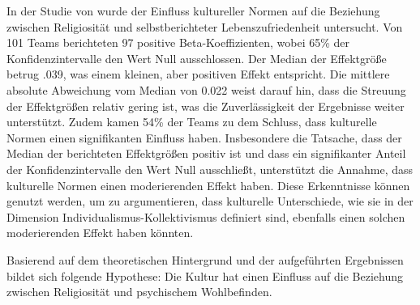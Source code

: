 In der Studie von \textcite{HoogeveenEtAl2023} wurde der Einfluss kultureller Normen auf die Beziehung zwischen Religiosität und selbstberichteter Lebenszufriedenheit untersucht. Von 101 Teams berichteten 97 positive Beta-Koeffizienten, wobei 65\% der Konfidenzintervalle den Wert Null ausschlossen. Der Median der Effektgröße betrug .039, was einem kleinen, aber positiven Effekt entspricht. Die mittlere absolute Abweichung vom Median von 0.022 weist darauf hin, dass die Streuung der Effektgrößen relativ gering ist, was die Zuverlässigkeit der Ergebnisse weiter unterstützt. Zudem kamen 54\% der Teams zu dem Schluss, dass kulturelle Normen einen signifikanten Einfluss haben.
Insbesondere die Tatsache, dass der Median der berichteten Effektgrößen positiv ist und dass ein signifikanter Anteil der Konfidenzintervalle den Wert Null ausschließt, unterstützt die Annahme, dass kulturelle Normen einen moderierenden Effekt haben. Diese Erkenntnisse können genutzt werden, um zu argumentieren, dass kulturelle Unterschiede, wie sie in der Dimension Individualismus-Kollektivismus definiert sind, ebenfalls einen solchen moderierenden Effekt haben könnten. 


Basierend auf dem theoretischen Hintergrund und der aufgeführten Ergebnissen bildet sich folgende Hypothese: Die Kultur hat einen Einfluss auf die Beziehung zwischen Religiosität und psychischem Wohlbefinden.




